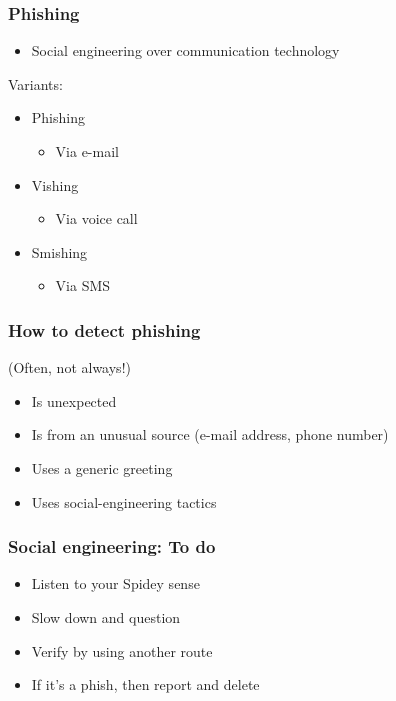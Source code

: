 \documentclass[blue]{beamer}
\begin{document}
\begin{frame}
\frametitle{Phishing}

\begin{itemize}
  \item Social engineering over communication technology
\end{itemize}

\begin{block}{Variants:}
\begin{itemize}
  \item Phishing
  \begin{itemize}
    \item Via e-mail
  \end{itemize}
  \item Vishing
  \begin{itemize}
    \item Via voice call
  \end{itemize}
  \item Smishing
  \begin{itemize}
    \item Via SMS
  \end{itemize}
\end{itemize}
\end{block}

\end{frame}



\begin{frame}
\frametitle{How to detect phishing}

(Often, not always!)
\begin{itemize}
  \item Is unexpected
  \item Is from an unusual source (e-mail address, phone number)
  \item Uses a generic greeting
  \item Uses social-engineering tactics
\end{itemize}

\end{frame}



\begin{frame}
\frametitle{Social engineering: To do}
\begin{itemize}
  \item Listen to your Spidey sense
  \item Slow down and question
  \item Verify by using another route
  \item If it's a phish, then report and delete
\end{itemize}

\end{frame}
\end{document}
